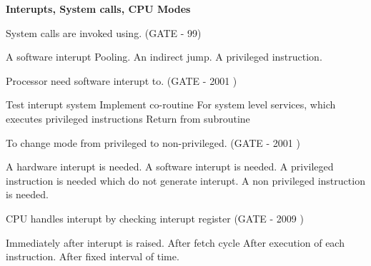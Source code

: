 
\centerline{\textbf{ \LARGE Interupts, System calls, CPU Modes}}


\setcounter{question}{0}


\begin{minipage}{\linewidth}

  \question System calls are invoked using. (GATE - 99)

  \begin{choices}
    \choice A software interupt
    \choice Pooling.
    \choice An indirect jump.
    \choice A privileged instruction.
  \end{choices}

\end{minipage}


\begin{minipage}{\linewidth}

  \question Processor need software interupt to. (GATE - 2001 )

  \begin{choices}
    \choice Test interupt system
    \choice Implement co-routine
    \choice For system level services, which executes privileged instructions
    \choice Return from subroutine
  \end{choices}

\end{minipage}


\begin{minipage}{\linewidth}

  \question To change mode from privileged to non-privileged. (GATE - 2001 )

  \begin{choices}
    \choice A hardware interupt is needed.
    \choice A software interupt is needed.
    \choice A privileged instruction is needed which do not generate interupt.
    \choice A non privileged instruction is needed.
  \end{choices}

\end{minipage}


\begin{minipage}{\linewidth}

  \question CPU handles interupt by checking interupt register (GATE - 2009 )

  \begin{choices}
    \choice Immediately after interupt is raised.
    \choice After fetch cycle
    \choice After execution of each instruction.
    \choice After fixed interval of time.
  \end{choices}

\end{minipage}

